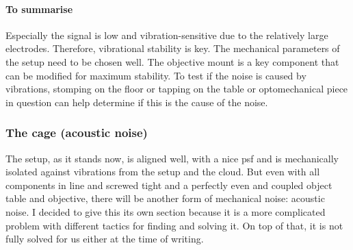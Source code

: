         \paragraph{To summarise} Especially the \scat signal is low and vibration-sensitive due to the relatively large electrodes. Therefore, vibrational stability is key. The mechanical parameters of the setup need to be chosen well. The objective mount is a key component that can be modified for maximum stability. To test if the noise is caused by vibrations, stomping on the floor or tapping on the table or optomechanical piece in question can help determine if this is the cause of the noise.
        
    \subsubsection{The cage (acoustic noise)}
        \label{sec:cage}
    	The setup, as it stands now, is aligned well, with a nice \gls{psf} and is mechanically isolated against vibrations from the setup and the cloud. But even with all components in line and screwed tight and a perfectly even and coupled object table and objective, there will be another form of mechanical noise: acoustic noise. I decided to give this its own section because it is a more complicated problem with different tactics for finding and solving it. On top of that, it is not fully solved for us either at the time of writing.\\  
